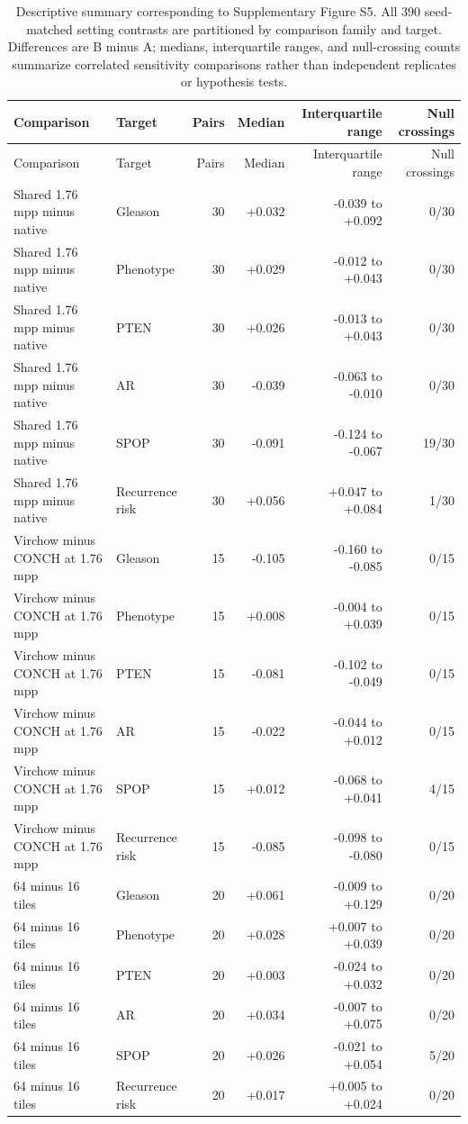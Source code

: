 \begingroup
\small
\setlength{\tabcolsep}{3pt}
\begin{longtable}{@{}p{}p{}rrrr@{}}
\caption{Descriptive summary corresponding to Supplementary Figure S5. All 390 seed-matched setting contrasts are partitioned by comparison family and target. Differences are B minus A; medians, interquartile ranges, and null-crossing counts summarize correlated sensitivity comparisons rather than independent replicates or hypothesis tests.}
\label{tab:supp-stability-contrast-summary}\\
\toprule
Comparison & Target & Pairs & Median & Interquartile range & Null crossings \\
\midrule
\endfirsthead
\toprule
Comparison & Target & Pairs & Median & Interquartile range & Null crossings \\
\midrule
\endhead
Shared 1.76 mpp minus native & Gleason & 30 & +0.032 & -0.039 to +0.092 & 0/30 \\
Shared 1.76 mpp minus native & Phenotype & 30 & +0.029 & -0.012 to +0.043 & 0/30 \\
Shared 1.76 mpp minus native & PTEN & 30 & +0.026 & -0.013 to +0.043 & 0/30 \\
Shared 1.76 mpp minus native & AR & 30 & -0.039 & -0.063 to -0.010 & 0/30 \\
Shared 1.76 mpp minus native & SPOP & 30 & -0.091 & -0.124 to -0.067 & 19/30 \\
Shared 1.76 mpp minus native & Recurrence risk & 30 & +0.056 & +0.047 to +0.084 & 1/30 \\
Virchow minus CONCH at 1.76 mpp & Gleason & 15 & -0.105 & -0.160 to -0.085 & 0/15 \\
Virchow minus CONCH at 1.76 mpp & Phenotype & 15 & +0.008 & -0.004 to +0.039 & 0/15 \\
Virchow minus CONCH at 1.76 mpp & PTEN & 15 & -0.081 & -0.102 to -0.049 & 0/15 \\
Virchow minus CONCH at 1.76 mpp & AR & 15 & -0.022 & -0.044 to +0.012 & 0/15 \\
Virchow minus CONCH at 1.76 mpp & SPOP & 15 & +0.012 & -0.068 to +0.041 & 4/15 \\
Virchow minus CONCH at 1.76 mpp & Recurrence risk & 15 & -0.085 & -0.098 to -0.080 & 0/15 \\
64 minus 16 tiles & Gleason & 20 & +0.061 & -0.009 to +0.129 & 0/20 \\
64 minus 16 tiles & Phenotype & 20 & +0.028 & +0.007 to +0.039 & 0/20 \\
64 minus 16 tiles & PTEN & 20 & +0.003 & -0.024 to +0.032 & 0/20 \\
64 minus 16 tiles & AR & 20 & +0.034 & -0.007 to +0.075 & 0/20 \\
64 minus 16 tiles & SPOP & 20 & +0.026 & -0.021 to +0.054 & 5/20 \\
64 minus 16 tiles & Recurrence risk & 20 & +0.017 & +0.005 to +0.024 & 0/20 \\
\bottomrule
\end{longtable}
\endgroup
